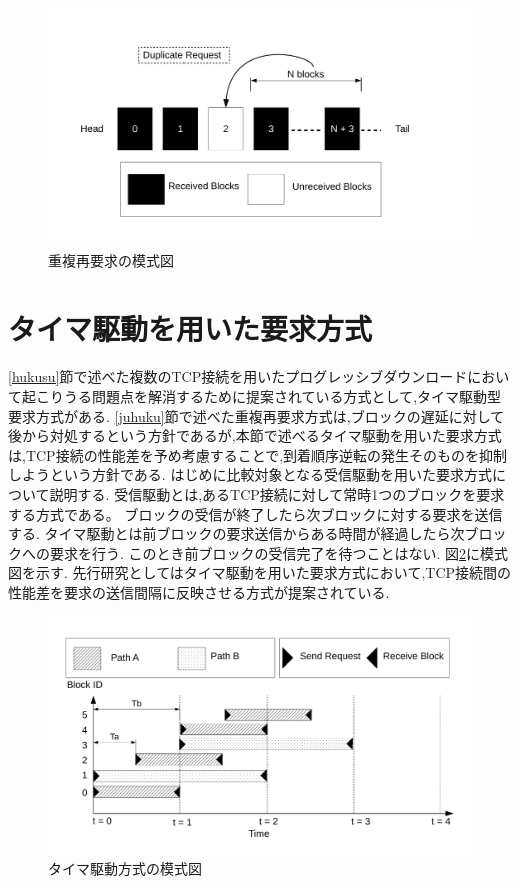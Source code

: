 \documentclass[a4j,12pt]{gradthesis_utf8}
\begin{document}
 \begin{figure}[ht]
     \centering
     \includegraphics[width=18cm]{figure/block_dup.pdf}
     \caption{重複再要求の模式図}
     \label{blockdup}
 \end{figure}

\newpage
 
 \section{タイマ駆動を用いた要求方式}
 \ref{hukusu}節で述べた複数のTCP接続を用いたプログレッシブダウンロードにおいて起こりうる問題点を解消するために提案されている方式として,タイマ駆動型要求方式がある.
 \ref{juhuku}節で述べた重複再要求方式は,ブロックの遅延に対して後から対処するという方針であるが,本節で述べるタイマ駆動を用いた要求方式は,TCP接続の性能差を予め考慮することで,到着順序逆転の発生そのものを抑制しようという方針である.
 はじめに比較対象となる受信駆動を用いた要求方式について説明する.
 受信駆動とは,あるTCP接続に対して常時1つのブロックを要求する方式である。
 ブロックの受信が終了したら次ブロックに対する要求を送信する.
 タイマ駆動とは前ブロックの要求送信からある時間が経過したら次ブロックへの要求を行う.
 このとき前ブロックの受信完了を待つことはない.
 図\ref{timer}に模式図を示す.
 先行研究としてはタイマ駆動を用いた要求方式において,TCP接続間の性能差を要求の送信間隔に反映させる方式が提案されている.
 
 \begin{figure}[ht]
 	\centering
 	\includegraphics[width=16.5cm]{figure/timer.pdf}
 	\caption{タイマ駆動方式の模式図}
	\label{timer}
 \end{figure}
 
\end{document}
